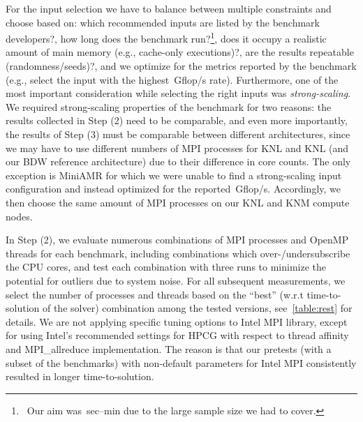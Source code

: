 %
%
For the input selection we have to balance between multiple constraints and choose based on: which
recommended inputs are listed by the benchmark developers?, how long does the benchmark run?\footnote{~Our
aim was~\unit[1]{sec}--\unit[10]{min} due to the large sample size we had to cover.}, does it occupy a
realistic amount of main memory (e.g., cache-only executions)?, are the results repeatable
(randomness/seeds)?, and we optimize for the metrics reported by the benchmark (e.g., select the input
with the highest~\unit[]{Gflop/s} rate).
%
%
Furthermore, one of the most important consideration while selecting the right inputs was
\textit{strong-scaling}. We required strong-scaling properties of the benchmark for two reasons:
the results collected in Step (2) need to be comparable, and even more importantly, the results
of Step (3) must be comparable between different architectures, since we may have to use different
numbers of MPI processes for KNL and KNL (and our BDW reference architecture) due to their difference
in core counts. The only exception is MiniAMR for which we were unable to find a strong-scaling
input configuration and instead optimized for the reported~\unit[]{Gflop/s}. Accordingly, we then choose
the same amount of MPI processes on our KNL and KNM compute nodes.

In Step (2), we evaluate numerous combinations of MPI processes and OpenMP threads
for each benchmark, including combinations which over-/undersubscribe the CPU cores, and test each
combination with three runs to minimize the potential for outliers due to system noise.
For all subsequent measurements, we select the number of processes and threads based on the ``best'' (w.r.t
time-to-solution of the solver) combination among the tested versions, see~\ref{table:rest} for details.
We are not applying specific tuning options to Intel MPI library, except for using Intel's recommended
settings for HPCG with respect to thread affinity and MPI\_allreduce implementation.
The reason is that our pretests (with a subset of the benchmarks) with non-default parameters for
Intel MPI consistently resulted in longer time-to-solution.


